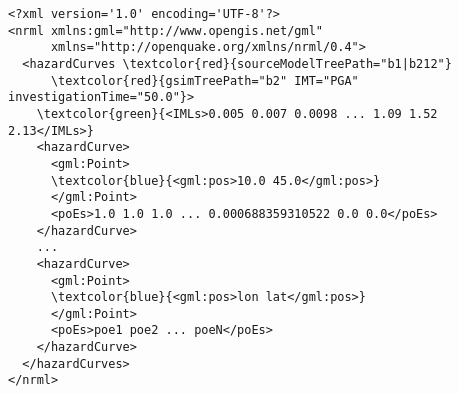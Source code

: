 \begin{Verbatim}[frame=single, commandchars=\\\{\}, fontsize=\small]
<?xml version='1.0' encoding='UTF-8'?>
<nrml xmlns:gml="http://www.opengis.net/gml"
      xmlns="http://openquake.org/xmlns/nrml/0.4">
  <hazardCurves \textcolor{red}{sourceModelTreePath="b1|b212"}
      \textcolor{red}{gsimTreePath="b2" IMT="PGA" investigationTime="50.0"}>
    \textcolor{green}{<IMLs>0.005 0.007 0.0098 ... 1.09 1.52 2.13</IMLs>}
    <hazardCurve>
      <gml:Point>
      \textcolor{blue}{<gml:pos>10.0 45.0</gml:pos>}
      </gml:Point>
      <poEs>1.0 1.0 1.0 ... 0.000688359310522 0.0 0.0</poEs>
    </hazardCurve>
    ...
    <hazardCurve>
      <gml:Point>
      \textcolor{blue}{<gml:pos>lon lat</gml:pos>}
      </gml:Point>
      <poEs>poe1 poe2 ... poeN</poEs>
    </hazardCurve>
  </hazardCurves>
</nrml>
\end{Verbatim}